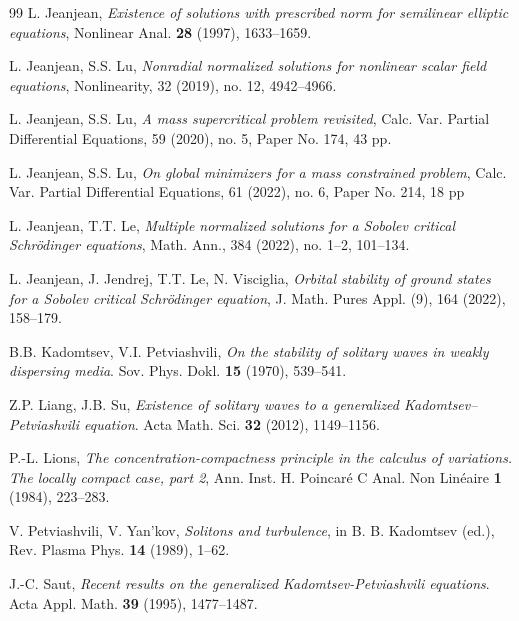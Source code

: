\documentclass[11pt]{amsart}
\numberwithin{equation}{section}
\begin{document}
{{{\begin{thebibliography}{99}
 L. Jeanjean, {\it Existence of solutions with prescribed norm for semilinear elliptic equations}, Nonlinear Anal. \textbf{28} (1997), 1633--1659.

 L. Jeanjean, S.S. Lu, {\it Nonradial normalized solutions for nonlinear scalar field equations}, Nonlinearity,
32 (2019), no. 12, 4942--4966.

 L. Jeanjean, S.S. Lu,  {\it A mass supercritical problem revisited},  Calc.
Var. Partial Differential Equations, 59 (2020), no. 5, Paper No. 174, 43 pp.

 L. Jeanjean, S.S. Lu, {\it On global minimizers for a mass constrained problem},
Calc. Var. Partial Differential Equations, 61 (2022), no. 6, Paper No. 214, 18 pp

 L. Jeanjean, T.T. Le, {\it Multiple normalized solutions for a Sobolev critical Schr\"odinger  equations}, Math. Ann.,
384 (2022), no. 1--2, 101--134.

 L. Jeanjean, J. Jendrej, T.T. Le, N. Visciglia, {\it Orbital stability of ground states for a Sobolev critical
    Schr\"odinger equation}, J. Math. Pures Appl. (9), 164 (2022), 158--179.

 B.B. Kadomtsev, V.I. Petviashvili, \emph{On the stability of solitary waves in weakly dispersing media}. Sov. Phys. Dokl. \textbf{15} (1970), 539--541.


 Z.P. Liang, J.B. Su, \emph{Existence of solitary waves to a generalized Kadomtsev--Petviashvili equation}. Acta Math. Sci. \textbf{32} (2012), 1149--1156.



P.-L. Lions,
\textit{The concentration-compactness principle in the calculus of variations. The locally compact case, part 2},
Ann. Inst. H. Poincar{\'e} C Anal. Non Lin{\'e}aire \textbf{1} (1984), 223--283.

V. Petviashvili, V. Yan'kov,
\textit{Solitons and turbulence},
in B. B. Kadomtsev (ed.), Rev. Plasma Phys. \textbf{14} (1989), 1--62.


 J.-C. Saut,  \emph{Recent results on the generalized Kadomtsev-Petviashvili equations}. Acta Appl. Math. \textbf{39} (1995), 1477--1487.


\end{thebibliography}}}}
\end{document}
